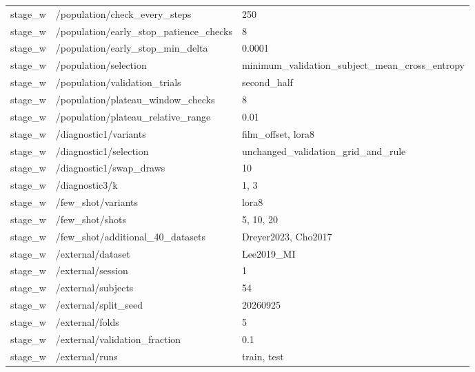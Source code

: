 \begin{longtable}{p{.65in}p{2.8in}p{3.2in}}
stage\_\allowbreak{}w & /population/check\_\allowbreak{}every\_\allowbreak{}steps & 250 \\
stage\_\allowbreak{}w & /population/early\_\allowbreak{}stop\_\allowbreak{}patience\_\allowbreak{}checks & 8 \\
stage\_\allowbreak{}w & /population/early\_\allowbreak{}stop\_\allowbreak{}min\_\allowbreak{}delta & 0.0001 \\
stage\_\allowbreak{}w & /population/selection & minimum\_\allowbreak{}validation\_\allowbreak{}subject\_\allowbreak{}mean\_\allowbreak{}cross\_\allowbreak{}entropy \\
stage\_\allowbreak{}w & /population/validation\_\allowbreak{}trials & second\_\allowbreak{}half \\
stage\_\allowbreak{}w & /population/plateau\_\allowbreak{}window\_\allowbreak{}checks & 8 \\
stage\_\allowbreak{}w & /population/plateau\_\allowbreak{}relative\_\allowbreak{}range & 0.01 \\
stage\_\allowbreak{}w & /diagnostic1/variants & film\_\allowbreak{}offset, lora8 \\
stage\_\allowbreak{}w & /diagnostic1/selection & unchanged\_\allowbreak{}validation\_\allowbreak{}grid\_\allowbreak{}and\_\allowbreak{}rule \\
stage\_\allowbreak{}w & /diagnostic1/swap\_\allowbreak{}draws & 10 \\
stage\_\allowbreak{}w & /diagnostic3/k & 1, 3 \\
stage\_\allowbreak{}w & /few\_\allowbreak{}shot/variants & lora8 \\
stage\_\allowbreak{}w & /few\_\allowbreak{}shot/shots & 5, 10, 20 \\
stage\_\allowbreak{}w & /few\_\allowbreak{}shot/additional\_\allowbreak{}40\_\allowbreak{}datasets & Dreyer2023, Cho2017 \\
stage\_\allowbreak{}w & /external/dataset & Lee2019\_\allowbreak{}MI \\
stage\_\allowbreak{}w & /external/session & 1 \\
stage\_\allowbreak{}w & /external/subjects & 54 \\
stage\_\allowbreak{}w & /external/split\_\allowbreak{}seed & 20260925 \\
stage\_\allowbreak{}w & /external/folds & 5 \\
stage\_\allowbreak{}w & /external/validation\_\allowbreak{}fraction & 0.1 \\
stage\_\allowbreak{}w & /external/runs & train, test \\

\end{longtable}
